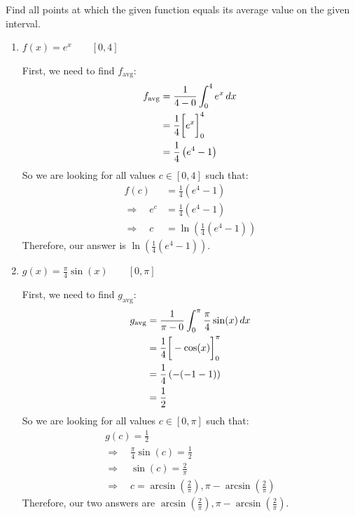 \documentclass[nooutcomes]{ximera}
\begin{document}
\begin{problem}

  Find all points at which the given function equals its average value on the given interval.
  \begin{enumerate}
    \item
      $f(x) = e^x	\qquad	[0,4]$
      \begin{freeResponse}
        First, we need to find $f_{\text{avg}}$:
        \begin{align*}
          f_{\text{avg}} &= \frac{1}{4-0} \int_0^4 e^x \,d x  \\
                         &= \frac{1}{4} \bigg[ e^x \bigg]_0^4  \\
                         &= \frac{1}{4} \left( e^4 - 1 \right)  
        \end{align*}
        So we are looking for all values $c \in [0,4]$ such that:
        \begin{align*}
          f(c) &= \frac{1}{4} (e^4 - 1)  \\
          \Longrightarrow \quad e^c &= \frac{1}{4} (e^4 - 1)  \\
          \Longrightarrow \quad c &= \ln \left( \frac{1}{4} (e^4 - 1) \right)
        \end{align*}
        Therefore, our answer is $\ln \left( \frac{1}{4} (e^4 - 1) \right)$.
      \end{freeResponse}

    \item
      $g(x) = \frac{\pi}{4} \sin(x)	\qquad	[0,\pi]$
      \begin{freeResponse}
        First, we need to find $g_{\text{avg}}$:
        \begin{align*}
          g_{\text{avg}} &= \frac{1}{\pi-0} \int_0^{\pi} \frac{\pi}{4} \sin(x) \,d x  \\
                         &= \frac{1}{4} \bigg[ -\cos(x) \bigg]_0^{\pi}  \\
                         &= \frac{1}{4} \left( - (-1-1) \right)  \\
                         &= \frac{1}{2}
        \end{align*}
        So we are looking for all values $c \in [0,\pi]$ such that:
        \begin{align*}
          &g(c) = \frac{1}{2}  \\
          &\Longrightarrow \quad \frac{\pi}{4} \sin(c) = \frac{1}{2}  \\
          &\Longrightarrow \quad \sin(c) = \frac{2}{\pi}  \\
          &\Longrightarrow \quad c = \arcsin \left( \frac{2}{\pi} \right), \pi - \arcsin \left( \frac{2}{\pi} \right)
          &\end{align*}
        Therefore, our two answers are $\arcsin \left( \frac{2}{\pi} \right), \pi - \arcsin \left( \frac{2}{\pi} \right)$.
    \end{freeResponse}
  \end{enumerate}
\end{problem}
\end{document}

